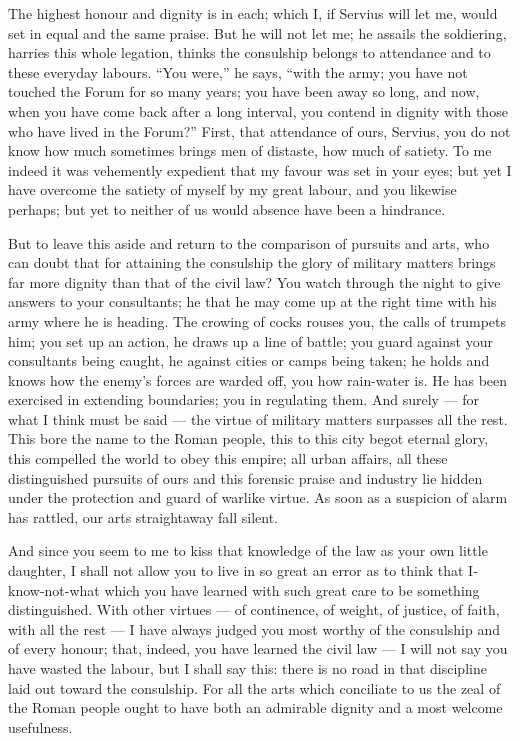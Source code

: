 The highest honour and dignity is in each; which I, if Servius will let me, would set in equal and the same praise. But he will not let me; he assails the soldiering, harries this whole legation, thinks the consulship belongs to attendance and to these everyday labours. ``You were,'' he says, ``with the army; you have not touched the Forum for so many years; you have been away so long, and now, when you have come back after a long interval, you contend in dignity with those who have lived in the Forum?'' First, that attendance of ours, Servius, you do not know how much sometimes brings men of distaste, how much of satiety. To me indeed it was vehemently expedient that my favour was set in your eyes; but yet I have overcome the satiety of myself by my great labour, and you likewise perhaps; but yet to neither of us would absence have been a hindrance.

 But to leave this aside and return to the comparison of pursuits and arts, who can doubt that for attaining the consulship the glory of military matters brings far more dignity than that of the civil law? You watch through the night to give answers to your consultants; he that he may come up at the right time with his army where he is heading. The crowing of cocks rouses you, the calls of trumpets him; you set up an action, he draws up a line of battle; you guard against your consultants being caught, he against cities or camps being taken; he holds and knows how the enemy's forces are warded off, you how rain-water is. He has been exercised in extending boundaries; you in regulating them. And surely --- for what I think must be said --- the virtue of military matters surpasses all the rest. This bore the name to the Roman people, this to this city begot eternal glory, this compelled the world to obey this empire; all urban affairs, all these distinguished pursuits of ours and this forensic praise and industry lie hidden under the protection and guard of warlike virtue. As soon as a suspicion of alarm has rattled, our arts straightaway fall silent.

 And since you seem to me to kiss that knowledge of the law as your own little daughter, I shall not allow you to live in so great an error as to think that I-know-not-what which you have learned with such great care to be something distinguished. With other virtues --- of continence, of weight, of justice, of faith, with all the rest --- I have always judged you most worthy of the consulship and of every honour; that, indeed, you have learned the civil law --- I will not say you have wasted the labour, but I shall say this: there is no road in that discipline laid out toward the consulship. For all the arts which conciliate to us the zeal of the Roman people ought to have both an admirable dignity and a most welcome usefulness.

